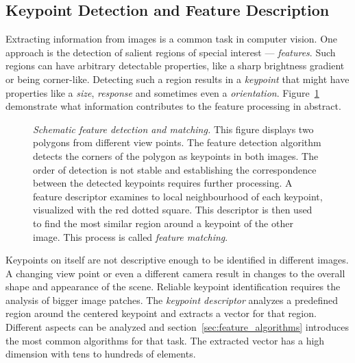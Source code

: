 \subsection{Keypoint Detection and Feature Description}

Extracting information from images is a common task in computer vision.
One approach is the detection of salient regions of special interest --- \emph{features}.
Such regions can have arbitrary detectable properties, like a sharp brightness gradient or being corner-like.
Detecting such a region results in a \emph{keypoint} that might have properties like a \emph{size}, \emph{response} and sometimes even a \emph{orientation}.
Figure~\ref{fig:features_example} demonstrate what information contributes to the feature processing in abstract.
\begin{figure}[H]
    \scalebox{0.95}{%
    
    }
    \caption[Schematic feature detection and matching]{\emph{Schematic feature detection and matching.} This figure displays two polygons from different view points. The feature detection algorithm detects the corners of the polygon as keypoints in both images. The order of detection is not stable and establishing the correspondence between the detected keypoints requires further processing. A feature descriptor examines to local neighbourhood of each keypoint, visualized with the red dotted square. This descriptor is then used to find the most similar region around a keypoint of the other image. This process is called \emph{feature matching}.}\label{fig:features_example}
\end{figure}
Keypoints on itself are not descriptive enough to be identified in different images.
A changing view point or even a different camera result in changes to the overall shape and appearance of the scene.
Reliable keypoint identification requires the analysis of bigger image patches.
The \emph{keypoint descriptor} analyzes a predefined region around the centered keypoint and extracts a vector for that region.
Different aspects can be analyzed and section~\ref{sec:feature_algorithms} introduces the most common algorithms for that task.
The extracted vector has a high dimension with tens to hundreds of elements.

